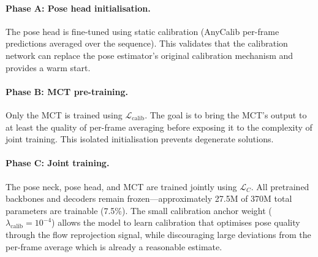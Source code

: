 \paragraph{Phase A: Pose head initialisation.} The pose head is fine-tuned using static calibration (AnyCalib per-frame predictions averaged over the sequence). This validates that the calibration network can replace the pose estimator's original calibration mechanism and provides a warm start.

\paragraph{Phase B: MCT pre-training.} Only the MCT is trained using $\mathcal{L}_\text{calib}$. The goal is to bring the MCT's output to at least the quality of per-frame averaging before exposing it to the complexity of joint training. This isolated initialisation prevents degenerate solutions.

\paragraph{Phase C: Joint training.} The pose neck, pose head, and MCT are trained jointly using $\mathcal{L}_C$. All pretrained backbones and decoders remain frozen---approximately 27.5M of 370M total parameters are trainable (7.5\%). The small calibration anchor weight ($\lambda_\text{calib} = 10^{-4}$) allows the model to learn calibration that optimises pose quality through the flow reprojection signal, while discouraging large deviations from the per-frame average which is already a reasonable estimate.
